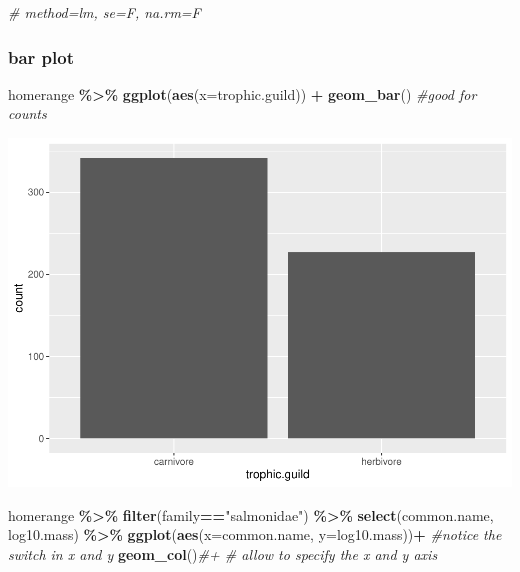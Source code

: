 \documentclass[
]{article}
\newenvironment{Shaded}{\begin{snugshade}}{\end{snugshade}}
\newcommand{\AttributeTok}[1]{\textcolor[rgb]{0.13,0.29,0.53}{#1}}
\newcommand{\CommentTok}[1]{\textcolor[rgb]{0.56,0.35,0.01}{\textit{#1}}}
\newcommand{\FunctionTok}[1]{\textcolor[rgb]{0.13,0.29,0.53}{\textbf{#1}}}
\newcommand{\NormalTok}[1]{#1}
\newcommand{\SpecialCharTok}[1]{\textcolor[rgb]{0.81,0.36,0.00}{\textbf{#1}}}
\newcommand{\StringTok}[1]{\textcolor[rgb]{0.31,0.60,0.02}{#1}}
\begin{document}
\begin{Shaded}
\begin{Highlighting}[]
\CommentTok{\# method=lm, se=F, na.rm=F}
\end{Highlighting}
\end{Shaded}

\hypertarget{bar-plot}{%
\subsubsection{bar plot}\label{bar-plot}}

\begin{Shaded}
\begin{Highlighting}[]
\NormalTok{homerange }\SpecialCharTok{\%\textgreater{}\%} 
  \FunctionTok{ggplot}\NormalTok{(}\FunctionTok{aes}\NormalTok{(}\AttributeTok{x=}\NormalTok{trophic.guild)) }\SpecialCharTok{+} 
  \FunctionTok{geom\_bar}\NormalTok{() }\CommentTok{\#good for counts}
\end{Highlighting}
\end{Shaded}

\includegraphics{Untitled_files/figure-latex/unnamed-chunk-20-1.pdf}

\begin{Shaded}
\begin{Highlighting}[]
\NormalTok{homerange }\SpecialCharTok{\%\textgreater{}\%} 
  \FunctionTok{filter}\NormalTok{(family}\SpecialCharTok{==}\StringTok{"salmonidae"}\NormalTok{) }\SpecialCharTok{\%\textgreater{}\%}
  \FunctionTok{select}\NormalTok{(common.name, log10.mass) }\SpecialCharTok{\%\textgreater{}\%} 
  \FunctionTok{ggplot}\NormalTok{(}\FunctionTok{aes}\NormalTok{(}\AttributeTok{x=}\NormalTok{common.name, }\AttributeTok{y=}\NormalTok{log10.mass))}\SpecialCharTok{+} \CommentTok{\#notice the switch in x and y}
  \FunctionTok{geom\_col}\NormalTok{()}\CommentTok{\#+ \# allow to specify the x and y axis}
\end{Highlighting}
\end{Shaded}
\end{document}
